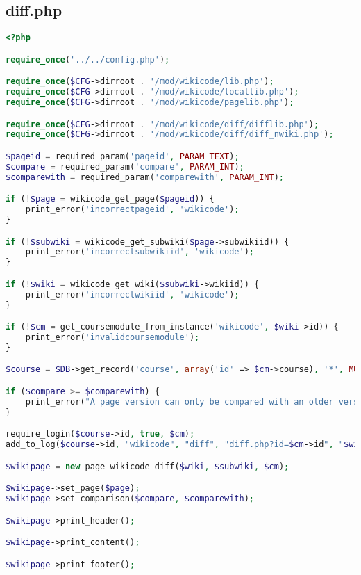 \subsection{diff.php}
\begin{lstlisting}[language=PHP]
<?php

require_once('../../config.php');

require_once($CFG->dirroot . '/mod/wikicode/lib.php');
require_once($CFG->dirroot . '/mod/wikicode/locallib.php');
require_once($CFG->dirroot . '/mod/wikicode/pagelib.php');

require_once($CFG->dirroot . '/mod/wikicode/diff/difflib.php');
require_once($CFG->dirroot . '/mod/wikicode/diff/diff_nwiki.php');

$pageid = required_param('pageid', PARAM_TEXT);
$compare = required_param('compare', PARAM_INT);
$comparewith = required_param('comparewith', PARAM_INT);

if (!$page = wikicode_get_page($pageid)) {
    print_error('incorrectpageid', 'wikicode');
}

if (!$subwiki = wikicode_get_subwiki($page->subwikiid)) {
    print_error('incorrectsubwikiid', 'wikicode');
}

if (!$wiki = wikicode_get_wiki($subwiki->wikiid)) {
    print_error('incorrectwikiid', 'wikicode');
}

if (!$cm = get_coursemodule_from_instance('wikicode', $wiki->id)) {
    print_error('invalidcoursemodule');
}

$course = $DB->get_record('course', array('id' => $cm->course), '*', MUST_EXIST);

if ($compare >= $comparewith) {
    print_error("A page version can only be compared with an older version.");
}

require_login($course->id, true, $cm);
add_to_log($course->id, "wikicode", "diff", "diff.php?id=$cm->id", "$wiki->id");

$wikipage = new page_wikicode_diff($wiki, $subwiki, $cm);

$wikipage->set_page($page); 
$wikipage->set_comparison($compare, $comparewith);

$wikipage->print_header();

$wikipage->print_content();

$wikipage->print_footer();
\end{lstlisting}

